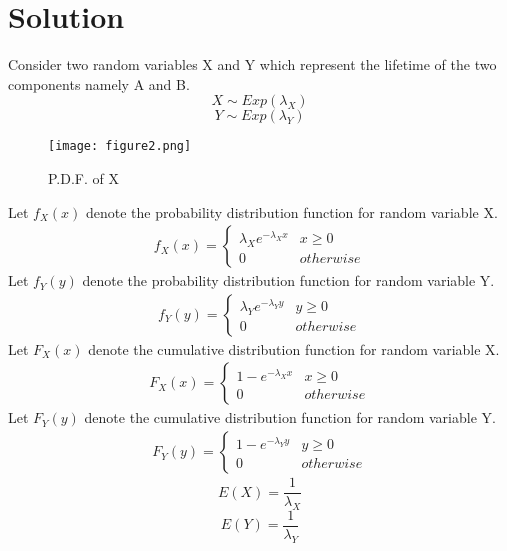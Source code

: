 \documentclass[journal,12pt,twocolumn]{IEEEtran}
\begin{document}
\section*{Solution}
Consider two random variables X and Y which represent the lifetime of the two components namely A and B.
\begin{equation}
    X \sim Exp(\lambda_X)
\end{equation}
\begin{equation}
    Y \sim Exp(\lambda_Y)
\end{equation}
\begin{figure}[h]
    \centering
    \texttt{[image: figure2.png]}
    \caption{P.D.F. of X }
    \label{fig:fig_label}
\end{figure}
Let $f_X(x)$ denote the probability distribution function for random variable X.
\begin{align}
f_{X}(x)=
 \begin{cases} 
      \lambda_X  e^{-\lambda_X  x} & x \geq 0 \\
      0 & otherwise
 \end{cases}
\end{align}
Let $f_Y(y)$ denote the probability distribution function for random variable Y.
\begin{align}
f_{Y}(y)=
 \begin{cases} 
      \lambda_Y  e^{-\lambda_Y  y} & y \geq 0 \\
      0 & otherwise
 \end{cases}
 \end{align}
 Let $F_X(x)$ denote the cumulative distribution function for random variable X.
\begin{align}
F_{X}(x)=
 \begin{cases} 
      1-e^{-\lambda_X  x} & x \geq 0 \\
      0 & otherwise
 \end{cases}
\end{align}
Let $F_Y(y)$ denote the cumulative distribution function for random variable Y.
\begin{align}
F_{Y}(y)=
 \begin{cases} 
      1-e^{-\lambda_Y  y} & y \geq 0 \\
      0 & otherwise
 \end{cases}
 \end{align}
\begin{equation}\label{meanx}
    E(X)=\dfrac{1}{\lambda_X}
\end{equation}
\begin{equation}\label{meany}
    E(Y)=\dfrac{1}{\lambda_Y}
\end{equation}
\end{document}
